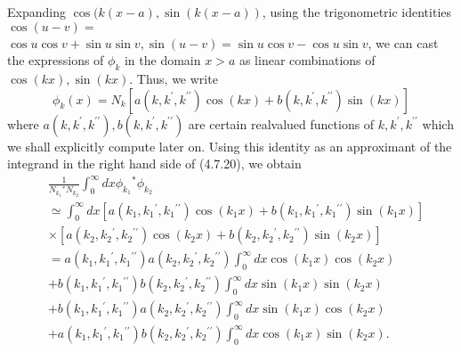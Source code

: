 \documentclass{article}
\begin{document}
Expanding $\cos (k(x-a), \sin (k(x-a))$, using the trigonometric identities $\cos (u-v)=$ $\cos u \cos v+\sin u \sin v, \sin (u-v)=\sin u \cos v-\cos u \sin v$, we can cast the expressions of $\phi_{k}$ in the domain $x>a$ as linear combinations of $\cos (k x), \sin (k x)$. Thus, we write
$$
\begin{equation*}
\phi_{k}(x)=N_{k}\left[a\left(k, k^{\prime}, k^{\prime \prime}\right) \cos (k x)+b\left(k, k^{\prime}, k^{\prime \prime}\right) \sin (k x)\right] \tag{4.7.21}
\end{equation*}
$$
where $a\left(k, k^{\prime}, k^{\prime \prime}\right), b\left(k, k^{\prime}, k^{\prime \prime}\right)$ are certain realvalued functions of $k, k^{\prime}, k^{\prime \prime}$ which we shall explicitly compute later on. Using this identity as an approximant of the integrand in the right hand side of (4.7.20), we obtain
$$
\begin{align*}
& \frac{1}{N_{k_{1}}{ }^{*} N_{k_{2}}} \int_{0}^{\infty} d x \phi_{k_{1}}{ }^{*} \phi_{k_{2}}  \tag{4.7.22}\\
& \simeq \int_{0}^{\infty} d x\left[a\left(k_{1}, k_{1}{ }^{\prime}, k_{1}{ }^{\prime \prime}\right) \cos \left(k_{1} x\right)+b\left(k_{1}, k_{1}{ }^{\prime}, k_{1}{ }^{\prime \prime}\right) \sin \left(k_{1} x\right)\right] \\
& \times\left[a\left(k_{2}, k_{2}{ }^{\prime}, k_{2}{ }^{\prime \prime}\right) \cos \left(k_{2} x\right)+b\left(k_{2}, k_{2}{ }^{\prime}, k_{2}{ }^{\prime \prime}\right) \sin \left(k_{2} x\right)\right] \\
& =a\left(k_{1}, k_{1}{ }^{\prime}, k_{1}{ }^{\prime \prime}\right) a\left(k_{2}, k_{2}{ }^{\prime}, k_{2}{ }^{\prime \prime}\right) \int_{0}^{\infty} d x \cos \left(k_{1} x\right) \cos \left(k_{2} x\right) \\
& +b\left(k_{1}, k_{1}{ }^{\prime}, k_{1}{ }^{\prime \prime}\right) b\left(k_{2}, k_{2}{ }^{\prime}, k_{2}{ }^{\prime \prime}\right) \int_{0}^{\infty} d x \sin \left(k_{1} x\right) \sin \left(k_{2} x\right) \\
& +b\left(k_{1}, k_{1}{ }^{\prime}, k_{1}{ }^{\prime \prime}\right) a\left(k_{2}, k_{2}{ }^{\prime}, k_{2}{ }^{\prime \prime}\right) \int_{0}^{\infty} d x \sin \left(k_{1} x\right) \cos \left(k_{2} x\right) \\
& +a\left(k_{1}, k_{1}{ }^{\prime}, k_{1}{ }^{\prime \prime}\right) b\left(k_{2}, k_{2}{ }^{\prime}, k_{2}{ }^{\prime \prime}\right) \int_{0}^{\infty} d x \cos \left(k_{1} x\right) \sin \left(k_{2} x\right) .
\end{align*}
$$
\end{document}
